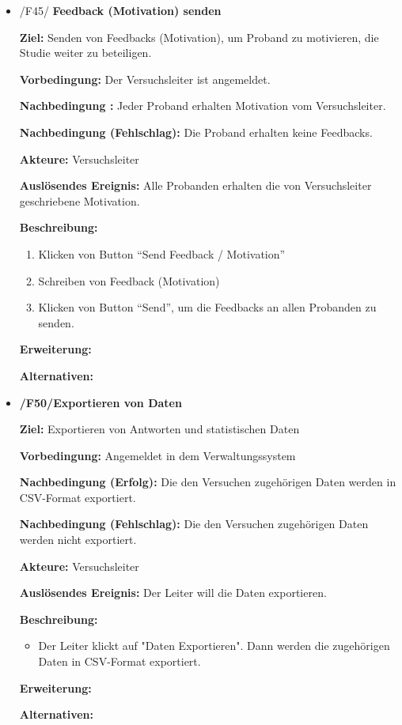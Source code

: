 \documentclass[a4paper]{scrreprt}
\begin{document}
\begin{itemize}
    
                \item /F45/ \textbf{Feedback (Motivation) senden}
                \par \textbf{Ziel: }Senden von Feedbacks (Motivation), um Proband zu motivieren, die Studie weiter zu beteiligen.
                \par \textbf{Vorbedingung: }Der Versuchsleiter ist angemeldet.
                \par \textbf{Nachbedingung : }Jeder Proband erhalten Motivation vom Versuchsleiter.
                \par \textbf{Nachbedingung (Fehlschlag): }Die Proband erhalten keine Feedbacks.
                \par \textbf{Akteure: }Versuchsleiter
                \par \textbf{Auslösendes Ereignis: }Alle Probanden erhalten die von Versuchsleiter geschriebene Motivation.
                \par \textbf{Beschreibung: }
                \begin{enumerate}
                    \item Klicken von Button ``Send Feedback / Motivation''
                    \item Schreiben von Feedback (Motivation)
                    \item Klicken von Button ``Send'', um die Feedbacks an allen Probanden zu senden.
                \end{enumerate}
                \par \textbf{Erweiterung: }
                \par \textbf{Alternativen: }
                    
                \item \textbf{/F50/Exportieren von Daten}
    
                \par \textbf{Ziel: }Exportieren von Antworten und statistischen Daten
                \par \textbf{Vorbedingung: }Angemeldet in dem Verwaltungssystem
                \par \textbf{Nachbedingung (Erfolg): }Die den Versuchen zugehörigen Daten werden in CSV-Format exportiert.
                \par \textbf{Nachbedingung (Fehlschlag): }Die den Versuchen zugehörigen Daten werden nicht exportiert.
                \par \textbf{Akteure: }Versuchsleiter
                \par \textbf{Auslösendes Ereignis: }Der Leiter will die Daten exportieren.
                \par \textbf{Beschreibung: }
                \begin{itemize}
                    \item Der Leiter klickt auf "Daten Exportieren". Dann werden die zugehörigen Daten in CSV-Format exportiert.
                \end{itemize}
                \par \textbf{Erweiterung: }
                \par \textbf{Alternativen: }
            \end{itemize}
\end{document}
